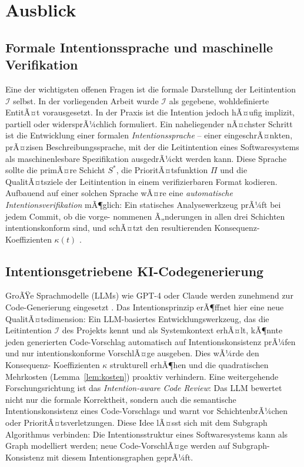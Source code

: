 ﻿\documentclass[a4paper,12pt]{article}
\theoremstyle{definition}
\begin{document}
\section{Ausblick}

\subsection{Formale Intentionssprache und maschinelle Verifikation}

Eine der wichtigsten offenen Fragen ist die formale Darstellung der
Leitintention $\mathcal{I}$ selbst. In der vorliegenden Arbeit wurde
$\mathcal{I}$ als gegebene, wohldefinierte EntitÃ¤t vorausgesetzt. In
der Praxis ist die Intention jedoch hÃ¤ufig implizit, partiell oder
widersprÃ¼chlich formuliert. Ein naheliegender nÃ¤chster Schritt ist die
Entwicklung einer formalen \emph{Intentionssprache} -- einer
eingeschrÃ¤nkten, prÃ¤zisen Beschreibungssprache, mit der die Leitintention
eines Softwaresystems als maschinenlesbare Spezifikation ausgedrÃ¼ckt
werden kann. Diese Sprache sollte die primÃ¤re Schicht $S^*$, die
PrioritÃ¤tsfunktion $\Pi$ und die QualitÃ¤tsziele der Leitintention
in einem verifizierbaren Format kodieren. Aufbauend auf einer solchen
Sprache wÃ¤re eine \emph{automatische Intentionsverifikation} mÃ¶glich:
Ein statisches Analysewerkzeug prÃ¼ft bei jedem Commit, ob die vorge-
nommenen Ã„nderungen in allen drei Schichten intentionskonform sind,
und schÃ¤tzt den resultierenden Konsequenz-Koeffizienten $\kappa(t)$
\cite{bass2012software, clements2010documenting}.

\subsection{Intentionsgetriebene KI-Codegenerierung}

GroÃŸe Sprachmodelle (LLMs) wie GPT-4 oder Claude werden zunehmend
zur Code-Generierung eingesetzt \cite{brown2020gpt3}. Das
Intentionsprinzip erÃ¶ffnet hier eine neue QualitÃ¤tsdimension: Ein
LLM-basiertes Entwicklungswerkzeug, das die Leitintention $\mathcal{I}$
des Projekts kennt und als Systemkontext erhÃ¤lt, kÃ¶nnte jeden generierten
Code-Vorschlag automatisch auf Intentionskonsistenz prÃ¼fen und nur
intentionskonforme VorschlÃ¤ge ausgeben. Dies wÃ¼rde den Konsequenz-
Koeffizienten $\kappa$ strukturell erhÃ¶hen und die quadratischen
Mehrkosten (Lemma~\ref{lem:kosten}) proaktiv verhindern. Eine
weitergehende Forschungsrichtung ist das \emph{Intention-aware Code
Review}: Das LLM bewertet nicht nur die formale Korrektheit, sondern
auch die semantische Intentionskonsistenz eines Code-Vorschlags und
warnt vor SchichtenbrÃ¼chen oder PrioritÃ¤tsverletzungen.
Diese Idee lÃ¤sst sich mit dem Subgraph Algorithmus \cite{epp2026subgraph}
verbinden: Die Intentionsstruktur eines Softwaresystems kann als Graph
modelliert werden; neue Code-VorschlÃ¤ge werden auf Subgraph-Konsistenz
mit diesem Intentionsgraphen geprÃ¼ft.
\end{document}
